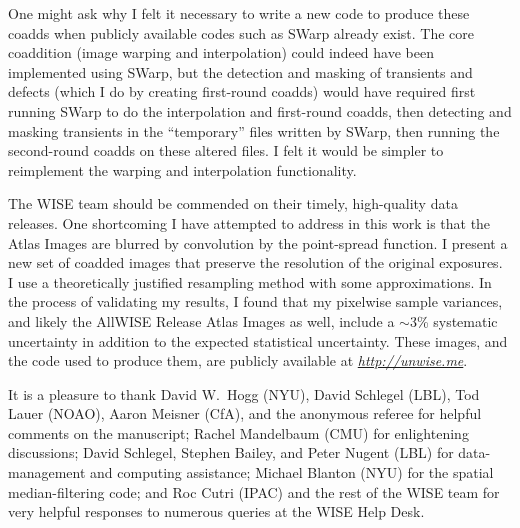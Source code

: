 \documentclass[11pt,preprint]{aastex}
\newcommand{\niceurl}[1]{\href{#1}{\textsl{#1}}}
\begin{document}
One might ask why I felt it necessary to write a new code to produce
these coadds when publicly available codes such as SWarp \citep{swarp}
already exist.  The core coaddition (image warping and interpolation)
could indeed have been implemented using SWarp, but the detection and
masking of transients and defects (which I do by creating first-round
coadds) would have required first running SWarp to do the
interpolation and first-round coadds, then detecting and masking
transients in the ``temporary'' files written by SWarp, then running
the second-round coadds on these altered files.  I felt it would be
simpler to reimplement the warping and interpolation functionality.




The WISE team should be commended on their timely, high-quality data
releases.  One shortcoming I have attempted to address in this work is
that the Atlas Images are blurred by convolution by the point-spread
function.  I present a new set of coadded images that preserve the
resolution of the original exposures.  I use a theoretically justified
resampling method with some approximations.  In the process of
validating my results, I found that my pixelwise sample variances, and
likely the AllWISE Release Atlas Images as well, include a $\sim$3\%
systematic uncertainty in addition to the expected statistical
uncertainty.  These images, and the code used to produce them, are
publicly available at \niceurl{http://unwise.me}.




\acknowledgements
%
It is a pleasure to thank
  David W.~Hogg (NYU),
  David Schlegel (LBL),
  Tod Lauer (NOAO),
  Aaron Meisner (CfA), and
  the anonymous referee
for helpful comments on the manuscript;
  Rachel Mandelbaum (CMU)
for enlightening discussions;
  David Schlegel,
  Stephen Bailey,
  and Peter Nugent (LBL)
for data-management and computing assistance;
  Michael Blanton (NYU) for the spatial median-filtering code;
and Roc Cutri (IPAC) and the rest of the WISE team for very helpful
responses to numerous queries at the WISE Help Desk.
\end{document}
